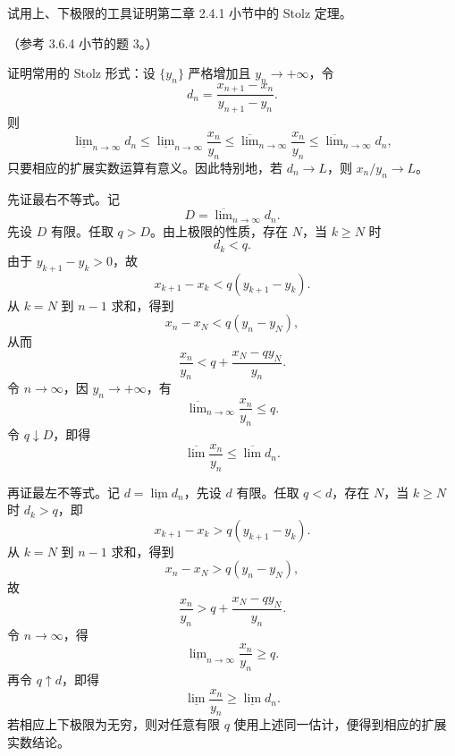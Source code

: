\begin{xreferenceproblem}[5]
试用上、下极限的工具证明第二章 2.4.1 小节中的 Stolz 定理。

  （参考 3.6.4 小节的题 3。）
\end{xreferenceproblem}
\begin{xsolution}
证明常用的 Stolz 形式：设 $\{y_n\}$ 严格增加且 $y_n\to+\infty$，令
\[
  d_n=\frac{x_{n+1}-x_n}{y_{n+1}-y_n}.
\]
则
\[
  \underline{\lim}_{n\to\infty}d_n
  \leqslant
  \underline{\lim}_{n\to\infty}\frac{x_n}{y_n}
  \leqslant
  \overline{\lim}_{n\to\infty}\frac{x_n}{y_n}
  \leqslant
  \overline{\lim}_{n\to\infty}d_n,
\]
只要相应的扩展实数运算有意义。因此特别地，若 $d_n\to L$，则 $x_n/y_n\to L$。

先证最右不等式。记
\[
  D=\overline{\lim}_{n\to\infty}d_n.
\]
先设 $D$ 有限。任取 $q>D$。由上极限的性质，存在 $N$，当 $k\geqslant N$ 时
\[
  d_k<q.
\]
由于 $y_{k+1}-y_k>0$，故
\[
  x_{k+1}-x_k<q(y_{k+1}-y_k).
\]
从 $k=N$ 到 $n-1$ 求和，得到
\[
  x_n-x_N<q(y_n-y_N),
\]
从而
\[
  \frac{x_n}{y_n}
  <q+\frac{x_N-qy_N}{y_n}.
\]
令 $n\to\infty$，因 $y_n\to+\infty$，有
\[
  \overline{\lim}_{n\to\infty}\frac{x_n}{y_n}\leqslant q.
\]
令 $q\downarrow D$，即得
\[
  \overline{\lim}\frac{x_n}{y_n}\leqslant\overline{\lim}d_n.
\]

再证最左不等式。记 $d=\underline{\lim}d_n$，先设 $d$ 有限。任取 $q<d$，存在 $N$，当 $k\geqslant N$ 时 $d_k>q$，即
\[
  x_{k+1}-x_k>q(y_{k+1}-y_k).
\]
从 $k=N$ 到 $n-1$ 求和，得到
\[
  x_n-x_N>q(y_n-y_N),
\]
故
\[
  \frac{x_n}{y_n}>q+\frac{x_N-qy_N}{y_n}.
\]
令 $n\to\infty$，得
\[
  \underline{\lim}_{n\to\infty}\frac{x_n}{y_n}\geqslant q.
\]
再令 $q\uparrow d$，即得
\[
  \underline{\lim}\frac{x_n}{y_n}\geqslant\underline{\lim}d_n.
\]
若相应上下极限为无穷，则对任意有限 $q$ 使用上述同一估计，便得到相应的扩展实数结论。
\end{xsolution}


